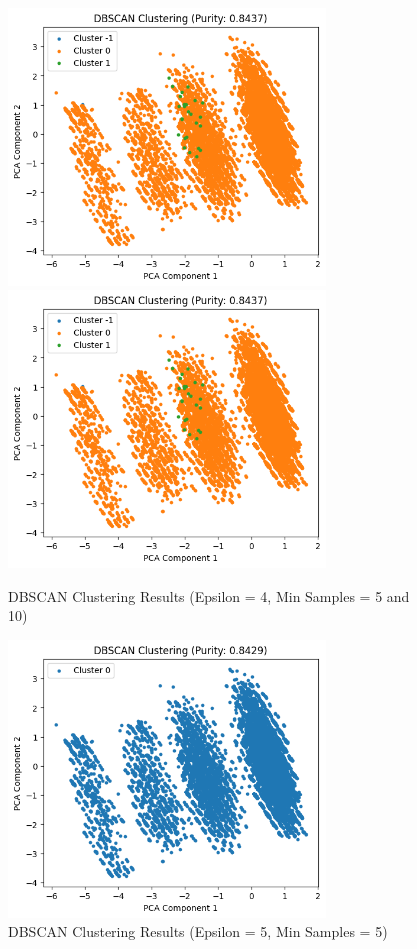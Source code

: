 \documentclass{article}
\begin{document}
\begin{figure}[H]\ContinuedFloat
\centering
\includegraphics[width=0.75\textwidth]{DBScan_4_5.png}
\includegraphics[width=0.75\textwidth]{DBScan_4_10.png}
\caption{DBSCAN Clustering Results (Epsilon = 4, Min Samples = 5 and 10)}
\end{figure}

\begin{figure}[H]\ContinuedFloat
\centering
\includegraphics[width=0.75\textwidth]{DBScan_5_5.png}
\caption{DBSCAN Clustering Results (Epsilon = 5, Min Samples = 5)}
\end{figure}
\end{document}
